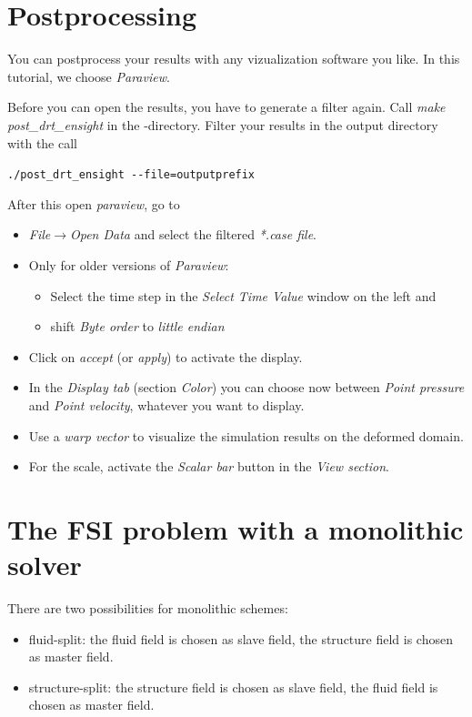 \section{Postprocessing}
\label{tut_fsi_preexo_2d:postprocess}
You can postprocess your results with any vizualization software you like. In this tutorial, we choose \emph{Paraview}. \newline

Before you can open the results, you have to generate a filter again. Call \emph{make post\_drt\_ensight} in the \baci{}-directory.
Filter your results in the output directory with the call 
\begin{center}
	\verb|./post_drt_ensight --file=outputprefix|
\end{center}
After this open \emph{paraview}, go to

\begin{itemize}
\item \emph{File$\to$Open Data} and select the filtered \emph{{*}.case
file}.
\item Only for older versions of \emph{Paraview}:
  \begin{itemize}
   \item Select the time step in the \emph{Select Time Value} window on the
left and
   \item shift \emph{Byte order} to \emph{little endian}
  \end{itemize}
\item Click on \emph{accept} (or \emph{apply}) to activate the display.
\item In the \emph{Display tab} (section \emph{Color}) you can choose now
between \emph{Point pressure} and \emph{Point velocity}, whatever
you want to display.
\item Use a \emph{warp vector} to visualize the simulation results on the
deformed domain.
\item For the scale, activate the \emph{Scalar bar} button in the \emph{View
section}.
\end{itemize}

\section{The FSI problem with a monolithic solver}
\label{tut_fsi_preexo_2d:monolithic}

There are two possibilities for monolithic schemes:
\begin{itemize}
  \item fluid-split: the fluid field is chosen as slave field, the structure
  field is chosen as master field.
  \item structure-split: the structure field is chosen as slave field, the fluid
  field is chosen as master field.
\end{itemize}

